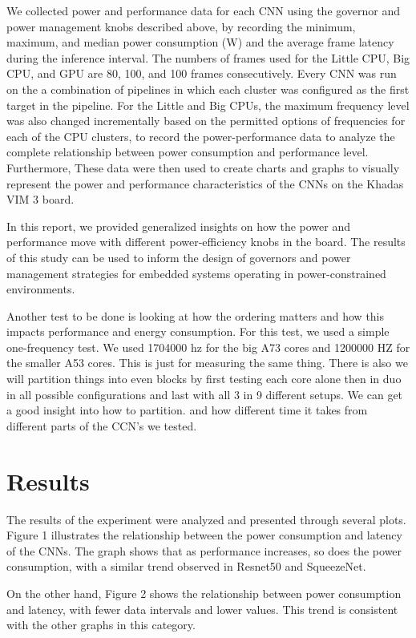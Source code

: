 \documentclass[a4paper, 12pt, fleqn]{article}
\begin{document}
We collected power and performance data for each CNN using the governor and power management knobs described above, by recording the minimum, maximum, and median power consumption (W) and the average frame latency during the inference interval. The numbers of frames used for the Little CPU, Big CPU, and GPU are 80, 100, and 100 frames consecutively. Every CNN was run on the a combination of pipelines in which each cluster was configured as the first target in the pipeline. For the Little and Big CPUs, the maximum frequency level was also changed incrementally based on the permitted options of frequencies for each of the CPU clusters, to record the power-performance data to analyze the complete relationship between power consumption and performance level. Furthermore, These data were then used to create charts and graphs to visually represent the power and performance characteristics of the CNNs on the Khadas VIM 3 board.

In this report, we provided generalized insights on how the power and performance move with different power-efficiency knobs in the board. The results of this study can be used to inform the design of governors and power management strategies for embedded systems operating in power-constrained environments.    

Another test to be done is looking at how the ordering matters and how this impacts performance and energy consumption. For this test, we used a simple one-frequency test. We used 1704000 hz for the big A73 cores and 1200000 HZ for the smaller A53 cores. This is just for measuring the same thing. There is also we will partition things into even blocks by first testing each core alone then in duo in all possible configurations and last with all 3 in 9 different setups. We can get a good insight into how to partition. and how different time it takes from different parts of the CCN's we tested. 


\section{Results}
The results of the experiment were analyzed and presented through several plots. Figure 1 illustrates the relationship between the power consumption and latency of the CNNs. The graph shows that as performance increases, so does the power consumption, with a similar trend observed in Resnet50 and SqueezeNet.

On the other hand, Figure 2 shows the relationship between power consumption and latency, with fewer data intervals and lower values. This trend is consistent with the other graphs in this category. 
\end{document}
